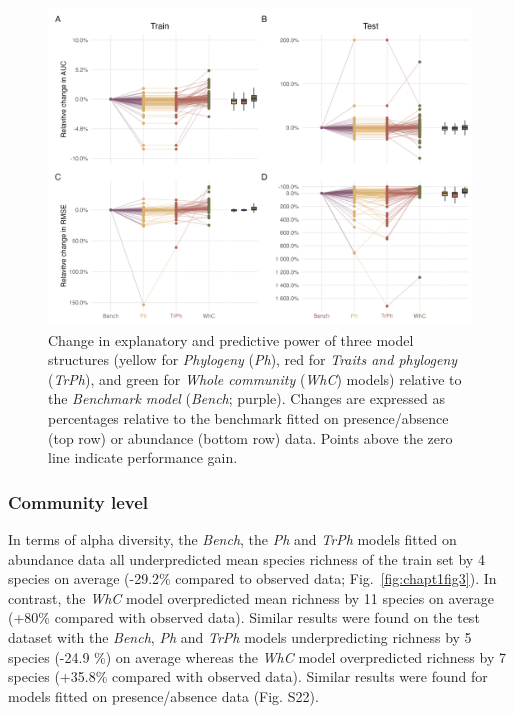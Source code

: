 \begin{refsection}
\begin{figure}
\hypertarget{fig:chapt1fig2}{%
\centering
\includegraphics{03-Chapitre1/figures/fig2.png}
\caption[Change in explanatory and predictive power of three model
structures.]{Change in explanatory and predictive power of three model
structures (yellow for \emph{Phylogeny} (\emph{Ph}), red for
\emph{Traits and phylogeny} (\emph{TrPh}), and green for \emph{Whole
community} (\emph{WhC}) models) relative to the \emph{Benchmark model}
(\emph{Bench}; purple). Changes are expressed as percentages relative to
the benchmark fitted on presence/absence (top row) or abundance (bottom
row) data. Points above the zero line indicate performance
gain.}\label{fig:chapt1fig2}
}
\end{figure}

\hypertarget{community-level}{%
\subsubsection{Community level}\label{community-level}}

In terms of alpha diversity, the \emph{Bench}, the \emph{Ph} and
\emph{TrPh} models fitted on abundance data all underpredicted mean
species richness of the train set by 4 species on average (-29.2\%
compared to observed data; Fig.~\ref{fig:chapt1fig3}). In contrast, the
\emph{WhC} model overpredicted mean richness by 11 species on average
(+80\% compared with observed data). Similar results were found on the
test dataset with the \emph{Bench}, \emph{Ph} and \emph{TrPh} models
underpredicting richness by 5 species (-24.9 \%) on average whereas the
\emph{WhC} model overpredicted richness by 7 species (+35.8\% compared
with observed data). Similar results were found for models fitted on
presence/absence data (Fig. S22).


\end{refsection}
